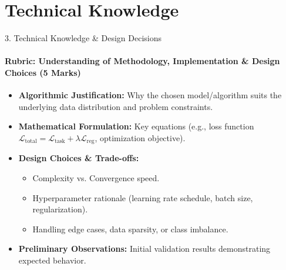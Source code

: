 \documentclass[aspectratio=169, 11pt]{beamer}
\begin{document}
\section{Technical Knowledge}
\begin{frame}{3. Technical Knowledge \& Design Decisions}
    \framesubtitle{Rubric: Understanding of Methodology, Implementation \& Design Choices (5 Marks)}
    \begin{itemize}
        \item \textbf{Algorithmic Justification:} Why the chosen model/algorithm suits the underlying data distribution and problem constraints.
        \item \textbf{Mathematical Formulation:} Key equations (e.g., loss function $\mathcal{L}_{\text{total}} = \mathcal{L}_{\text{task}} + \lambda \mathcal{L}_{\text{reg}}$, optimization objective).
        \item \textbf{Design Choices \& Trade-offs:}
        \begin{itemize}
            \item Complexity vs. Convergence speed.
            \item Hyperparameter rationale (learning rate schedule, batch size, regularization).
            \item Handling edge cases, data sparsity, or class imbalance.
        \end{itemize}
        \item \textbf{Preliminary Observations:} Initial validation results demonstrating expected behavior.
    \end{itemize}
\end{frame}

\end{document}
